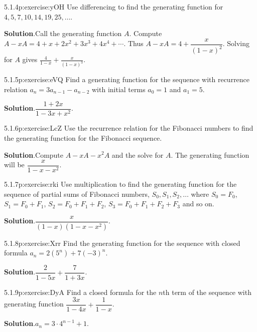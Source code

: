 \documentclass[twoside,11pt,]{book}
\newcommand{\blocktitlefont}{\relax}
\numberwithin{equation}{chapter}
\renewcommand{\d}{\displaystyle}
\begin{document}
\begin{divisionsolution}{5.1.4}{}{p:exercise:yOH}%
Use differencing to find the generating function for \(4, 5, 7, 10, 14, 19, 25, \ldots\).%
\par\smallskip%
\noindent\textbf{\blocktitlefont Solution}.\quad{}Call the generating function \(A\). Compute \(A - xA = 4 + x + 2x^2 + 3x^3 + 4x^4 + \cdots\). Thus \(A - xA = 4 + \dfrac{x}{(1-x)^2}\). Solving for \(A\) gives \(\d\frac{4}{1-x} + \frac{x}{(1-x)^3}\).%
\end{divisionsolution}%
\begin{divisionsolution}{5.1.5}{}{p:exercise:eVQ}%
Find a generating function for the sequence with recurrence relation \(a_n = 3a_{n-1} - a_{n-2}\) with initial terms \(a_0 = 1\) and \(a_1 = 5\).%
\par\smallskip%
\noindent\textbf{\blocktitlefont Solution}.\quad{}\(\dfrac{1+2x}{1-3x + x^2}\).%
\end{divisionsolution}%
\begin{divisionsolution}{5.1.6}{}{p:exercise:LcZ}%
Use the recurrence relation for the Fibonacci numbers to find the generating function for the Fibonacci sequence.%
\par\smallskip%
\noindent\textbf{\blocktitlefont Solution}.\quad{}Compute \(A - xA - x^2A\) and the solve for \(A\). The generating function will be \(\dfrac{x}{1-x-x^2}\).%
\end{divisionsolution}%
\begin{divisionsolution}{5.1.7}{}{p:exercise:rki}%
Use multiplication to find the generating function for the sequence of partial sums of Fibonacci numbers, \(S_0, S_1, S_2, \ldots\) where \(S_0 = F_0\), \(S_1 = F_0 + F_1\), \(S_2 = F_0 + F_1 + F_2\), \(S_3 = F_0 + F_1 + F_2 + F_3\) and so on.%
\par\smallskip%
\noindent\textbf{\blocktitlefont Solution}.\quad{}\(\dfrac{x}{(1-x)(1-x-x^2)}\).%
\end{divisionsolution}%
\begin{divisionsolution}{5.1.8}{}{p:exercise:Xrr}%
Find the generating function for the sequence with closed formula \(a_n = 2(5^n) + 7(-3)^n\).%
\par\smallskip%
\noindent\textbf{\blocktitlefont Solution}.\quad{}\(\dfrac{2}{1-5x} + \dfrac{7}{1+3x}\).%
\end{divisionsolution}%
\begin{divisionsolution}{5.1.9}{}{p:exercise:DyA}%
Find a closed formula for the \(n\)th term of the sequence with generating function \(\dfrac{3x}{1-4x} + \dfrac{1}{1-x}\).%
\par\smallskip%
\noindent\textbf{\blocktitlefont Solution}.\quad{}\(a_n = 3\cdot 4^{n-1} + 1\).%
\end{divisionsolution}%
\end{document}
